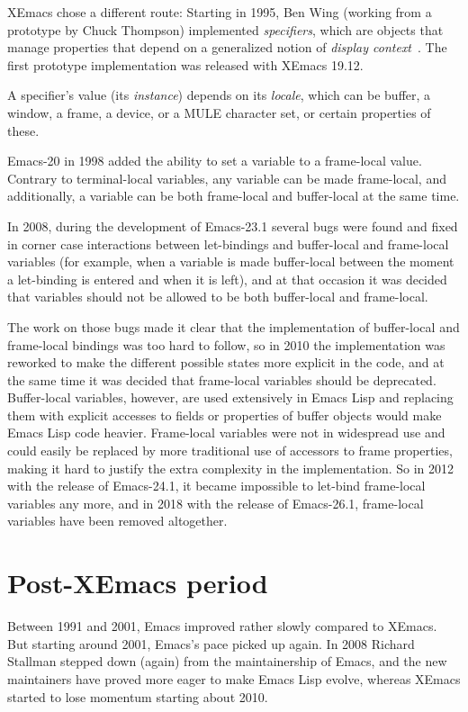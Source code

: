 \documentclass[format=acmsmall, review]{acmart}
\newcommand \Elisp {Emacs Lisp}
\begin{document}
XEmacs chose a different route: Starting in 1995, Ben Wing (working
from a prototype by Chuck Thompson) implemented
\emph{specifiers}, which are objects that manage properties that
depend on a generalized notion of \emph{display
  context}~\cite{XEmacsLispRef1998}.  The first prototype
implementation was released with XEmacs 19.12.

A specifier's value (its \emph{instance}) depends on its
\emph{locale}, which can be buffer, a window, a frame, a device, or a MULE
character set, or certain properties of these.

Emacs-20 in 1998 added the ability to set a variable to a frame-local
value.  Contrary to terminal-local variables, any variable can be made
frame-local, and additionally, a variable can be both frame-local and
buffer-local at the same time.

In 2008, during the development of Emacs-23.1 several bugs were found and
fixed in corner case interactions between let-bindings and buffer-local and
frame-local variables (for example, when a variable is made buffer-local
between the moment a let-binding is entered and when it is left), and at
that occasion it was decided that variables should not be allowed to be both
buffer-local and frame-local.

The work on those bugs made it clear that the implementation of buffer-local
and frame-local bindings was too hard to follow, so in 2010 the
implementation was reworked to make the different possible states more
explicit in the code, and at the same time it was decided that frame-local
variables should be deprecated.  Buffer-local variables, however, are used
extensively in \Elisp{} and replacing them with explicit accesses to fields
or properties of buffer objects would make \Elisp{} code heavier.
Frame-local variables were not in widespread use and could easily be
replaced by more traditional use of accessors to frame properties, making it
hard to justify the extra complexity in the implementation.  So in 2012 with
the release of Emacs-24.1, it became impossible to let-bind frame-local
variables any more, and in 2018 with the release of Emacs-26.1, frame-local
variables have been removed altogether.

\section{Post-XEmacs period}           %
\label{sec:post-xemacs}

Between 1991 and 2001, Emacs improved rather slowly compared to XEmacs.
But starting around 2001, Emacs's pace picked up again.  In 2008 Richard
Stallman stepped down (again) from the maintainership of Emacs, and the new
maintainers have proved more eager to make \Elisp{} evolve, whereas XEmacs
started to lose momentum starting about 2010.
\end{document}
